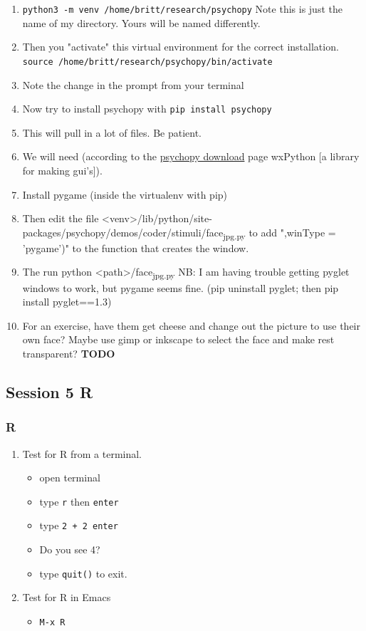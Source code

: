 \documentclass{article}
\begin{document}
\begin{enumerate}
\begin{enumerate}
\begin{enumerate}
\begin{enumerate}
\item \texttt{python3 -m venv /home/britt/research/psychopy}
Note this is just the name of my directory. Yours will be named differently.
\item Then you "activate" this virtual environment for the correct installation.
\texttt{source /home/britt/research/psychopy/bin/activate}
\item Note the change in the prompt from your terminal
\item Now try to install psychopy with
\texttt{pip install psychopy}
\item This will pull in  a lot of files. Be patient.
\item We will need (according to the \href{https://www.psychopy.org/download.html\#download}{psychopy download} page wxPython [a library for making gui's]).
\item Install pygame (inside the virtualenv with pip)
\item Then edit the file <venv>/lib/python/site-packages/psychopy/demos/coder/stimuli/face\textsubscript{jpg.py} to add ",winType = 'pygame')" to the function that creates the window.
\item The run python <path>/face\textsubscript{jpg.py}
NB: I am having trouble getting pyglet windows to work, but pygame seems fine. (pip uninstall pyglet; then pip install pyglet==1.3)
\item For an exercise, have them get cheese and change out the picture to use their own face? Maybe use gimp or inkscape to select the face and make rest transparent? \textbf{\textbf{TODO}}
\end{enumerate}
\end{enumerate}
\end{enumerate}
\end{enumerate}
\subsection{Session 5 R}
\label{sec:org175115b}
\subsubsection{R}
\label{sec:orgde86140}
\begin{enumerate}
\item Test for R from a terminal.
\begin{itemize}
\item open terminal
\item type \texttt{r} then \texttt{enter}
\item type \texttt{2 + 2 enter}
\item Do you see 4?
\item type \texttt{quit()} to exit.
\end{itemize}
\item Test for R in Emacs
\begin{itemize}
\item \texttt{M-x R}
\end{itemize}
\end{enumerate}
\end{document}
